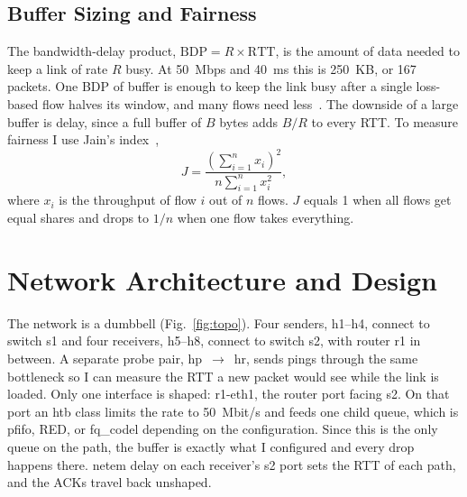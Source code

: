 \documentclass[conference,12pt,letterpaper]{IEEEtran}
\begin{document}
\subsection{Buffer Sizing and Fairness}
The bandwidth-delay product, $\mathrm{BDP} = R \times \mathrm{RTT}$, is the amount of data needed to keep a link of rate $R$ busy. At 50~Mbps and 40~ms this is 250~KB, or 167 packets. One BDP of buffer is enough to keep the link busy after a single loss-based flow halves its window, and many flows need less~\cite{appenzeller}. The downside of a large buffer is delay, since a full buffer of $B$ bytes adds $B/R$ to every RTT. To measure fairness I use Jain's index~\cite{jain},
\begin{equation}
J = \frac{\left(\sum_{i=1}^{n} x_i\right)^2}{n \sum_{i=1}^{n} x_i^2},
\end{equation}
where $x_i$ is the throughput of flow $i$ out of $n$ flows. $J$ equals 1 when all flows get equal shares and drops to $1/n$ when one flow takes everything.

\section{Network Architecture and Design}
\label{sec:arch}

The network is a dumbbell (Fig.~\ref{fig:topo}). Four senders, h1--h4, connect to switch s1 and four receivers, h5--h8, connect to switch s2, with router r1 in between. A separate probe pair, hp~$\rightarrow$~hr, sends pings through the same bottleneck so I can measure the RTT a new packet would see while the link is loaded. Only one interface is shaped: r1-eth1, the router port facing s2. On that port an htb class limits the rate to 50~Mbit/s and feeds one child queue, which is pfifo, RED, or fq\_codel depending on the configuration. Since this is the only queue on the path, the buffer is exactly what I configured and every drop happens there. netem delay on each receiver's s2 port sets the RTT of each path, and the ACKs travel back unshaped.
\end{document}
